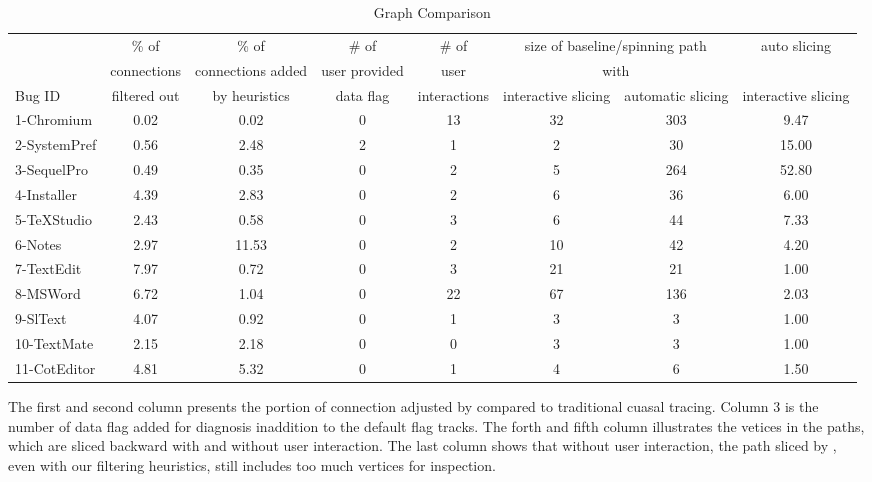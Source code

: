 \begin{table*}[ht]
\footnotesize
\centering
  \begin{tabularx}{\textwidth}{l|ccccccc}
 	   & \% of & \% of & \# of& \# of & \multicolumn{2}{c}{size of baseline/spinning path}& auto slicing\\
       & connections & connections added  & user provided & user  & \multicolumn{2}{c}{with}  & \/ \\
Bug ID & filtered out & by heuristics & data flag & interactions & interactive slicing & automatic slicing &  interactive slicing\\
\hline
\hline
1-Chromium & 0.02 & 0.02 & 0 & 13 & 32 & 303 & 9.47\\
2-SystemPref & 0.56 & 2.48 & 2 & 1 & 2 & 30 & 15.00\\
3-SequelPro & 0.49 & 0.35 & 0 & 2 & 5 & 264 & 52.80\\
4-Installer & 4.39 & 2.83 & 0 & 2 & 6 & 36  & 6.00\\
5-TeXStudio & 2.43 & 0.58 & 0 & 3 & 6 & 44  & 7.33\\
6-Notes & 2.97 & 11.53 & 0 & 2 & 10 & 42 & 4.20\\
7-TextEdit & 7.97 & 0.72 & 0 & 3 & 21 & 21 & 1.00\\
8-MSWord & 6.72 & 1.04 & 0 & 22 & 67 & 136 & 2.03\\
9-SlText & 4.07 & 0.92 & 0 & 1 & 3 & 3 & 1.00\\
10-TextMate & 2.15 & 2.18 & 0 & 0 & 3 & 3 & 1.00\\
11-CotEditor & 4.81 & 5.32 & 0 & 1 & 4 & 6 & 1.50\\

\hline
  \end{tabularx}

  \parbox{\textwidth}
  {\caption{Graph Comparison} 
    {The first and second column presents the portion of connection adjusted by \xxx compared
     to traditional cuasal tracing. Column 3 is the number of data flag added for diagnosis
     inaddition to the default flag \xxx tracks. The forth and fifth column illustrates
     the vetices in the paths, which are sliced backward with and without user interaction.
     The last column shows that without user interaction, the path sliced by \xxx, even with
     our filtering heuristics, still includes too much vertices for inspection.
    }
  \label{table:results}
  }

\end{table*}


